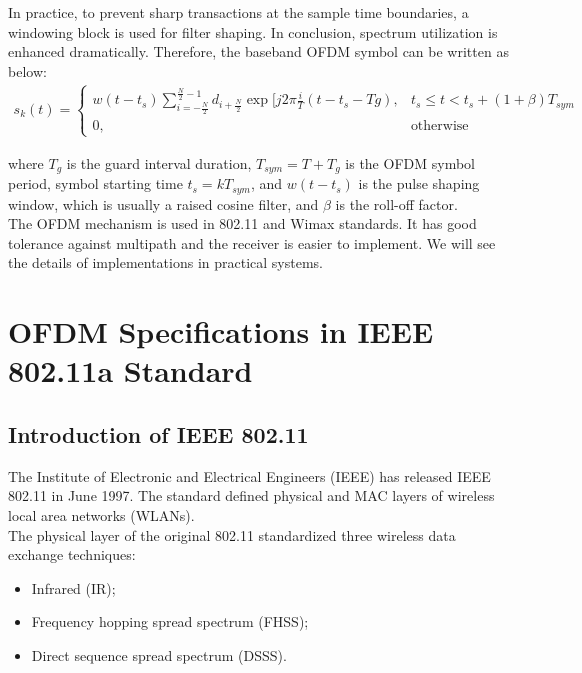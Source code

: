 In practice, to prevent sharp transactions at the sample time boundaries, a windowing block is used for filter shaping. In conclusion, spectrum utilization is enhanced dramatically. Therefore, the baseband OFDM symbol can be written as below:\\
\begin{equation} \label{ofdm_window}
\begin{split}
s_{k}(t)=
\left\{
	\begin{array}{ll}
	w(t - t_{s})\sum\limits_{i=-\frac{N}{2}}^{\frac{N}{2}-1} d_{i+\frac{N}{2}} \exp\lbrack j2\pi\frac{i}{T}(t- t_{s}- T{g}) , & t_{s}\le t < t_{s} + (1+\beta)T_{sym}\\
	0, & \mbox{otherwise}
	\end{array}
\right.
\end{split}
\end{equation}

where $T_{g}$ is the guard interval duration, $T_{sym}= T+ T_{g}$ is the OFDM symbol period,
symbol starting time $t_{s}= kT_{sym}$, and $w(t-t_{s})$ is the pulse shaping window, which is
usually a raised cosine filter, and $\beta$ is the roll-off factor.\\
The OFDM mechanism is used in 802.11 and Wimax standards. \cite{802_11} It has good tolerance against multipath and the receiver is easier to implement. We will see the details of implementations in practical systems.\\


\section{OFDM Specifications in IEEE 802.11a Standard}

\subsection{Introduction of IEEE 802.11}
The Institute of Electronic and Electrical Engineers (IEEE) has released IEEE 802.11 in June 1997. The standard defined physical and MAC layers of wireless local area networks (WLANs).\\
The physical layer of the original 802.11 standardized three wireless data exchange techniques:

\begin{itemize}
  \item Infrared (IR);
  \item Frequency hopping spread spectrum (FHSS);
  \item Direct sequence spread spectrum (DSSS).
\end{itemize}



